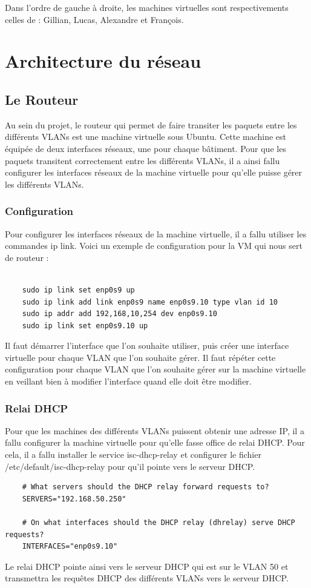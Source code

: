 \documentclass[a4paper,12pt]{report}
\begin{document}
            Dans l'ordre de gauche à droite, les machines virtuelles sont respectivements celles de : Gillian, Lucas, Alexandre et François.

    \chapter{Architecture du réseau}
    \section{Le Routeur}
    Au sein du projet, le routeur qui permet de faire transiter les paquets entre les différents VLANs est une machine virtuelle sous Ubuntu. Cette machine est équipée de deux interfaces réseaux, une pour chaque bâtiment. Pour que les paquets transitent correctement entre les différents VLANs, il a ainsi fallu configurer les interfaces réseaux de la machine virtuelle pour qu'elle puisse gérer les différents VLANs.
        \subsection{Configuration}
        Pour configurer les interfaces réseaux de la machine virtuelle, il a fallu utiliser les commandes ip link. Voici un exemple de configuration pour la VM qui nous sert de routeur :
        \begin{verbatim}

    sudo ip link set enp0s9 up
    sudo ip link add link enp0s9 name enp0s9.10 type vlan id 10 
    sudo ip addr add 192,168,10,254 dev enp0s9.10 
    sudo ip link set enp0s9.10 up
        \end{verbatim}
        Il faut démarrer l'interface que l'on souhaite utiliser, puis créer une interface virtuelle pour chaque VLAN que l'on souhaite gérer. Il faut répéter cette configuration pour chaque VLAN que l'on souhaite gérer sur la machine virtuelle en veillant bien à modifier l'interface quand elle doit être modifier. 
        \subsection{Relai DHCP}
        Pour que les machines des différents VLANs puissent obtenir une adresse IP, il a fallu configurer la machine virtuelle pour qu'elle fasse office de relai DHCP. Pour cela, il a fallu installer le service isc-dhcp-relay et configurer le fichier /etc/default/isc-dhcp-relay pour qu'il pointe vers le serveur DHCP.
        \begin{verbatim}
    # What servers should the DHCP relay forward requests to?
    SERVERS="192.168.50.250"

    # On what interfaces should the DHCP relay (dhrelay) serve DHCP requests?
    INTERFACES="enp0s9.10"
        \end{verbatim}
        Le relai DHCP pointe ainsi vers le serveur DHCP qui est sur le VLAN 50 et transmettra les requêtes DHCP des différents VLANs vers le serveur DHCP.
\end{document}
